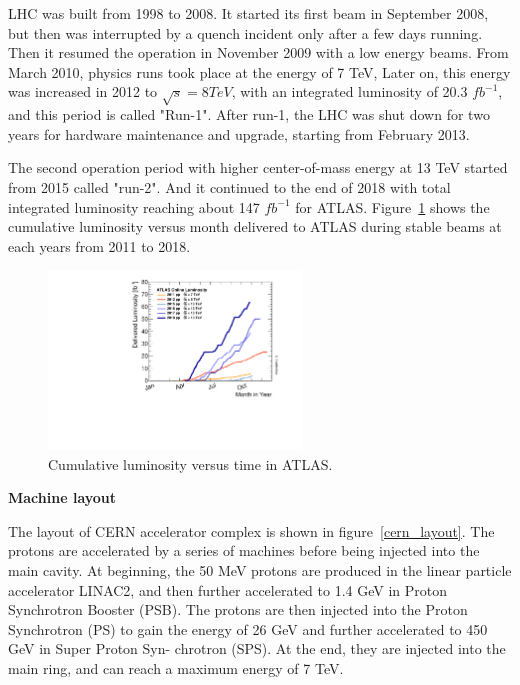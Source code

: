 LHC was built from 1998 to 2008. 
It started its first beam in September 2008, but then was interrupted by a quench incident only after a few days running.
Then it resumed the operation in November 2009 with a low energy beams.
From March 2010, physics runs took place at the energy of 7 TeV,
Later on, this energy was increased in 2012 to $\sqrt{s} = 8 TeV$, with an integrated luminosity of 20.3 $fb^{-1}$,
and this period is called "Run-1".
After run-1, the LHC was shut down for two years for hardware maintenance and upgrade, starting from February 2013.

The second operation period with higher center-of-mass energy at 13 TeV started from 2015 called "run-2".
And it continued to the end of 2018 with total integrated luminosity reaching about 147 $fb^{-1}$ for ATLAS.
Figure~\ref{fig:lumi_vs_month} shows the cumulative luminosity versus month delivered to ATLAS during stable beams 
at each years from 2011 to 2018.
\begin{figure}[!htb]
  \centering
  \includegraphics[width=0.6\textwidth]{figures/Detector/intlumivsyear.pdf}
  \caption{Cumulative luminosity versus time in ATLAS.}
  \label{fig:lumi_vs_month}
\end{figure}

\textbf{Machine layout}

The layout of CERN accelerator complex is shown in figure~\ref{cern_layout}.
The protons are accelerated by a series of machines before being injected into the main cavity.
At beginning, the 50 MeV protons are produced in the linear particle accelerator LINAC2, 
and then further accelerated to 1.4 GeV in Proton Synchrotron Booster (PSB).
The protons are then injected into the Proton Synchrotron (PS) to gain the energy of 26 GeV
and further accelerated to 450 GeV in Super Proton Syn- chrotron (SPS).
At the end, they are injected into the main ring, and can reach a maximum energy of 7 TeV.

